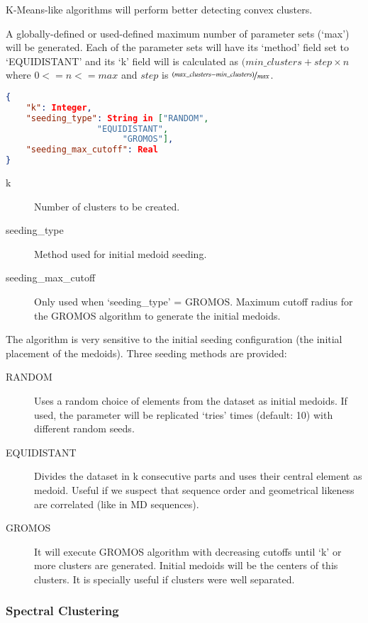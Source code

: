 K-Means-like algorithms will perform better detecting convex clusters.


A globally-defined or used-defined maximum number of parameter sets
(`max') will be generated. Each of the parameter sets will have its
`method' field set to `EQUIDISTANT' and its `k' field will is calculated as 
$(min\_clusters+step \times n$ where $0<=n<=max$ and $step$ is $\nicefrac{(max\_clusters-min\_clusters)}{max}$.

\begin{lstlisting}[language=json,firstnumber=1] 
{ 	
	"k": Integer, 	
	"seeding_type": String in ["RANDOM", 
			      "EQUIDISTANT", 
			           "GROMOS"], 	
	"seeding_max_cutoff": Real 
}
\end{lstlisting}

\begin{description}
	\item [k] Number of clusters to be created. 
	\item [seeding\_type] Method used for initial medoid seeding. 
	\item [seeding\_max\_cutoff] Only used when `seeding\_type' =
	GROMOS. Maximum cutoff radius for the GROMOS algorithm to generate
	the initial medoids.
\end{description}

The algorithm is very sensitive to the initial seeding configuration
(the initial placement of the medoids). Three seeding methods are
provided: 

\begin{description}
	\item [RANDOM] Uses a random choice of elements from the dataset
	as initial medoids. If used, the parameter will be replicated `tries'
	times (default: 10) with different random seeds. 
	\item [EQUIDISTANT] Divides the dataset in k consecutive parts
	and uses their central element as medoid. Useful if we suspect that
	sequence order and geometrical likeness are correlated (like in MD
	sequences). 
	\item [GROMOS] It will execute GROMOS algorithm with decreasing
	cutoffs until `k' or more clusters are generated. Initial medoids
	will be the centers of this clusters. It is specially useful if clusters
	were well separated. 
\end{description}


\subsubsection{Spectral Clustering}

